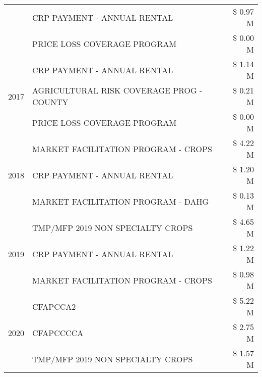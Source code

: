 \begin{tabular}{llr}
 & CRP PAYMENT - ANNUAL RENTAL                   & \$ 0.97 M \\
 & PRICE LOSS COVERAGE PROGRAM                   & \$ 0.00 M \\
\cline{1-3}
\multirow[t]{3}{*}{2017} & CRP PAYMENT - ANNUAL RENTAL & \$ 1.14 M \\
 & AGRICULTURAL RISK COVERAGE PROG - COUNTY & \$ 0.21 M \\
 & PRICE LOSS COVERAGE PROGRAM & \$ 0.00 M \\
\cline{1-3}
\multirow[t]{3}{*}{2018} & MARKET FACILITATION PROGRAM - CROPS & \$ 4.22 M \\
 & CRP PAYMENT - ANNUAL RENTAL & \$ 1.20 M \\
 & MARKET FACILITATION PROGRAM - DAHG & \$ 0.13 M \\
\cline{1-3}
\multirow[t]{3}{*}{2019} & TMP/MFP 2019 NON SPECIALTY CROPS & \$ 4.65 M \\
 & CRP PAYMENT - ANNUAL RENTAL & \$ 1.22 M \\
 & MARKET FACILITATION PROGRAM - CROPS & \$ 0.98 M \\
\cline{1-3}
\multirow[t]{3}{*}{2020} & CFAPCCA2 & \$ 5.22 M \\
 & CFAPCCCCA & \$ 2.75 M \\
 & TMP/MFP 2019 NON SPECIALTY CROPS & \$ 1.57 M \\
\cline{1-3}
\bottomrule
\end{tabular}
